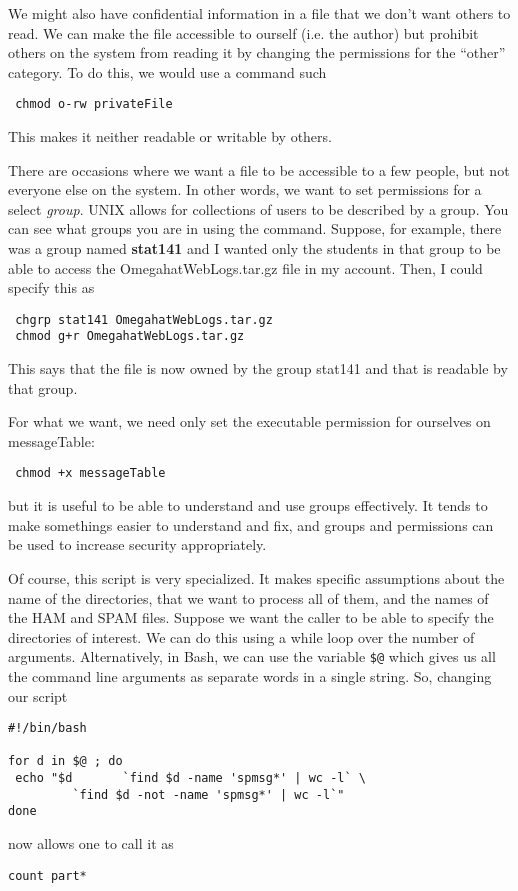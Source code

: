 We might also have confidential information
in a file that we don't want others to read.
We can make the file accessible to ourself
(i.e. the author) but prohibit others on
the system from reading it by changing the permissions
for the ``other'' category.
To do this, we would use a command such
\begin{verbatim}
 chmod o-rw privateFile
\end{verbatim}
This makes it neither readable or writable by others.

There are occasions where we want a file to be
accessible to a few people, but not everyone else on the system.
In other words, we want to set permissions for a select
\textit{group}.
UNIX allows for collections of users to be described by a
group.  You can see what groups you are in using
the  command.   Suppose, for 
example, there was a group named 
\textbf{stat141} and I wanted only the students in
that group to be able to access the OmegahatWebLogs.tar.gz
file in my account. Then, I could specify this as
\begin{verbatim}
 chgrp stat141 OmegahatWebLogs.tar.gz
 chmod g+r OmegahatWebLogs.tar.gz
\end{verbatim}
This says that the file is now owned by the group stat141
and that is readable by that group.

For what we want, we need only set the executable permission
for ourselves on messageTable:
\begin{verbatim}
 chmod +x messageTable
\end{verbatim}
but  it is useful to be able to understand and use groups
effectively. It tends to make somethings easier
to understand and fix, and groups and permissions can be used
to increase security appropriately.



Of course, this script is very specialized.
It makes specific assumptions about the name of the directories,
that we want to process all of them,  
and the names of the HAM and SPAM files.
Suppose we want the caller to be able to specify
the directories of interest.
We can do this using a while loop over the number of
arguments.
Alternatively,  in Bash, we can use
the variable \verb+$@+ which gives us
all the command line arguments as separate words
in a single string.
So, changing our script
\begin{verbatim}
#!/bin/bash

for d in $@ ; do 
 echo "$d       `find $d -name 'spmsg*' | wc -l` \
         `find $d -not -name 'spmsg*' | wc -l`"
done
\end{verbatim}
now allows one to call it as
\begin{verbatim}
count part*
\end{verbatim}


